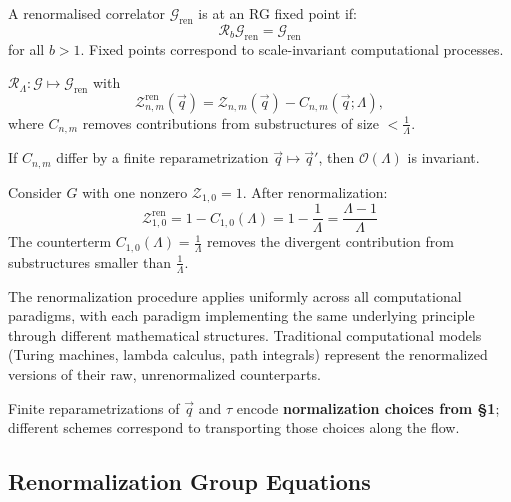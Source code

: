 \begin{definition}
\label{def:rg-fixed-points-renorm}
A renormalised correlator $\mathcal{G}_{\text{ren}}$ is at an RG fixed point if:
\[
\mathcal{R}_b \mathcal{G}_{\text{ren}} = \mathcal{G}_{\text{ren}}
\]
for all $b > 1$. Fixed points correspond to scale-invariant computational processes.
\end{definition}

\begin{definition}
\label{def:R-map}
$\mathcal{R}_\Lambda: \mathcal{G} \mapsto \mathcal{G}_{\text{ren}}$ with
\[
\mathcal{Z}_{n,m}^{\text{ren}}(\vec{q}) = \mathcal{Z}_{n,m}(\vec{q}) - C_{n,m}(\vec{q};\Lambda),
\]
where $C_{n,m}$ removes contributions from substructures of size $<\frac{1}{\Lambda}$.
\end{definition}

\begin{proposition}
\label{prop:scheme-independence}
If $C_{n,m}$ differ by a finite reparametrization $\vec{q} \mapsto \vec{q}'$, then $\mathcal{O}(\Lambda)$ is invariant.
\end{proposition}

\begin{example}
Consider $G$ with one nonzero $\mathcal{Z}_{1,0} = 1$. After renormalization:
\[
\mathcal{Z}_{1,0}^{\text{ren}} = 1 - C_{1,0}(\Lambda) = 1 - \frac{1}{\Lambda} = \frac{\Lambda-1}{\Lambda}
\]
The counterterm $C_{1,0}(\Lambda) = \frac{1}{\Lambda}$ removes the divergent contribution from substructures smaller than $\frac{1}{\Lambda}$.
\end{example}

The renormalization procedure applies uniformly across all computational paradigms, with each paradigm implementing the same underlying principle through different mathematical structures. Traditional computational models (Turing machines, lambda calculus, path integrals) represent the renormalized versions of their raw, unrenormalized counterparts.

Finite reparametrizations of $\vec{q}$ and $\tau$ encode \textbf{normalization choices from §1}; different schemes correspond to transporting those choices along the flow.

\subsection{Renormalization Group Equations}

